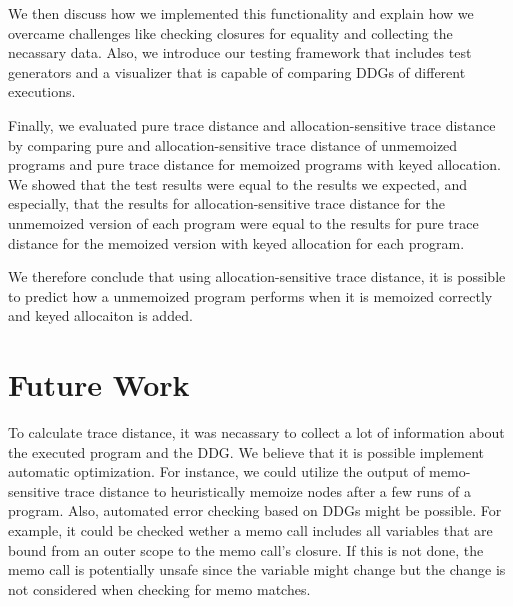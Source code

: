 We then discuss how we implemented this functionality and explain how we overcame challenges like checking closures for equality and collecting the necassary data. Also, we introduce our testing framework that includes test generators and a visualizer that is capable of comparing DDGs of different executions. 

Finally, we evaluated pure trace distance and allocation-sensitive trace distance by comparing pure and allocation-sensitive trace distance of unmemoized programs and pure trace distance for memoized programs with keyed allocation. We showed that the test results were equal to the results we expected, and especially, that the results for allocation-sensitive trace distance for the unmemoized version of each program were equal to the results for pure trace distance for the memoized version with keyed allocation for each program. 

We therefore conclude that using allocation-sensitive trace distance, it is possible to predict how a unmemoized program performs when it is memoized correctly and keyed allocaiton is added. 

\section{Future Work}

To calculate trace distance, it was necassary to collect a lot of information about the executed program and the DDG. We believe that it is possible implement automatic optimization. For instance, we could utilize the output of memo-sensitive trace distance to heuristically memoize nodes after a few runs of a program. Also, automated error checking based on DDGs might be possible. For example, it could be checked wether a memo call includes all variables that are bound from an outer scope to the memo call's closure. If this is not done, the memo call is potentially unsafe since the variable might change but the change is not considered when checking for memo matches. 


